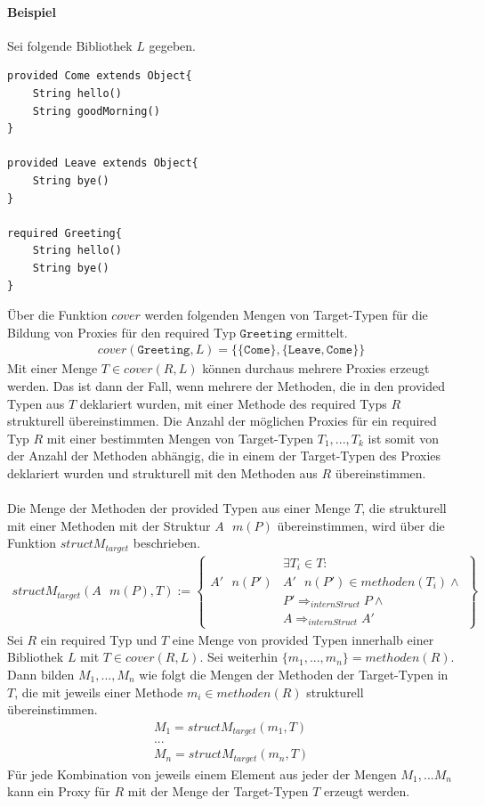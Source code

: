 \documentclass[a4paper,12pt]{article}
\newcommand{\methodForm}[3]
{
\mathit{#1}\texttt{ }\mathit{#2(#3)}  
}
\begin{document}
\paragraph{Beispiel}
Sei folgende Bibliothek $L$ gegeben.
\begin{lstlisting}[style = dsl]
provided Come extends Object{
	String hello()
	String goodMorning()
}

provided Leave extends Object{
	String bye()
}

required Greeting{
	String hello()
	String bye()
}
\end{lstlisting}
Über die Funktion $\mathit{cover}$ werden folgenden Mengen von Target-Typen für die Bildung von Proxies für den required Typ $\texttt{Greeting}$ ermittelt.
\begin{gather*}
\mathit{cover(\texttt{Greeting},L)} = \{
	\{\texttt{Come}\},\{\texttt{Leave}, \texttt{Come}\}
\}
\end{gather*}
\noindent
Mit einer Menge $T \in \mathit{cover(R,L)}$ können durchaus mehrere Proxies erzeugt werden. Das ist dann der Fall, wenn mehrere der Methoden, die in den provided Typen aus $T$ deklariert wurden, mit einer Methode des required Typs $R$ strukturell übereinstimmen.
Die Anzahl der möglichen Proxies für ein required Typ $R$ mit einer bestimmten Mengen von Target-Typen $T_1,...,T_k$ ist somit von der Anzahl der Methoden abhängig, die in einem der Target-Typen des Proxies deklariert wurden und strukturell mit den Methoden aus $R$ übereinstimmen. 
\\\\
Die Menge der Methoden der provided Typen aus einer Menge $T$, die strukturell mit einer Methoden mit der Struktur $\methodForm{A}{m}{P}$ übereinstimmen, wird über die Funktion $\mathit{structM_{target}}$ beschrieben.
\begin{gather*}
\mathit{structM_{target}(\methodForm{A}{m}{P}, T)} := 
\left\{\begin{array}{l|l}
						& \exists \mathit{T_i} \in T :\\
\methodForm{A'}{n}{P'}	& \methodForm{A'}{n}{P'} 													\in	\mathit{methoden(T_i)} \wedge 
							\mathit{ }\\
						& P' \Rightarrow_{internStruct} P \wedge 									\mathit{ } \\
						& A \Rightarrow_{internStruct} A' 
\end{array}\right\}
\end{gather*}
\noindent
Sei $R$ ein required Typ und $T$ eine Menge von provided Typen innerhalb einer Bibliothek $L$ mit $T \in \mathit{cover(R,L)}$. Sei weiterhin $\{m_1,...,m_n\} = \mathit{methoden(R)}$.
Dann bilden $M_1,...,M_n$ wie folgt die Mengen der Methoden der Target-Typen in $T$, die mit jeweils einer Methode $m_i \in \mathit{methoden(R)}$  strukturell übereinstimmen.
\begin{gather*}
M_1 = \mathit{structM_{target}(m_1,T)}\\
...\\
M_n = \mathit{structM_{target}(m_n,T)}
\end{gather*}
Für jede Kombination von jeweils einem Element aus jeder der Mengen $M_1,...M_n$ kann ein Proxy für $R$ mit der Menge der Target-Typen $T$ erzeugt werden.
\end{document}
